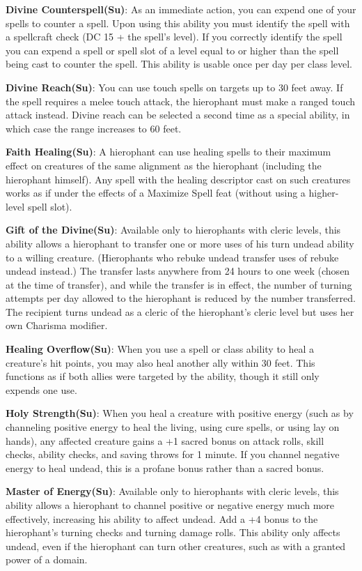 \textbf{Divine Counterspell(Su)}: As an immediate action, you can expend one of your spells to counter a spell. Upon using this ability you must identify the spell with a spellcraft check (DC 15 + the spell's level). If you correctly identify the spell you can expend a spell or spell slot of a level equal to or higher than the spell being cast to counter the spell. This ability is usable once per day per class level.

\textbf{Divine Reach(Su)}: You can use touch spells on targets up to 30 feet away. If the spell requires a melee touch attack, the hierophant must make a ranged touch attack instead. Divine reach can be selected a second time as a special ability, in which case the range increases to 60 feet.

\textbf{Faith Healing(Su)}: A hierophant can use healing spells to their maximum effect on creatures of the same alignment as the hierophant (including the hierophant himself). Any spell with the healing descriptor cast on such creatures works as if under the effects of a Maximize Spell feat (without using a higher-level spell slot).

\textbf{Gift of the Divine(Su)}: Available only to hierophants with cleric levels, this ability allows a hierophant to transfer one or more uses of his turn undead ability to a willing creature. (Hierophants who rebuke undead transfer uses of rebuke undead instead.) The transfer lasts anywhere from 24 hours to one week (chosen at the time of transfer), and while the transfer is in effect, the number of turning attempts per day allowed to the hierophant is reduced by the number transferred. The recipient turns undead as a cleric of the hierophant’s cleric level but uses her own Charisma modifier.

\textbf{Healing Overflow(Su)}: When you use a spell or class ability to heal a creature's hit points, you may also heal another ally within 30 feet. This functions as if both allies were targeted by the ability, though it still only expends one use.

\textbf{Holy Strength(Su)}: When you heal a creature with positive energy (such as by channeling positive energy to heal the living, using cure spells, or using lay on hands), any affected creature gains a +1 sacred bonus on attack rolls, skill checks, ability checks, and saving throws for 1 minute. If you channel negative energy to heal undead, this is a profane bonus rather than a sacred bonus.

\textbf{Master of Energy(Su)}: Available only to hierophants with cleric levels, this ability allows a hierophant to channel positive or negative energy much more effectively, increasing his ability to affect undead. Add a +4 bonus to the hierophant’s turning checks and turning damage rolls. This ability only affects undead, even if the hierophant can turn other creatures, such as with a granted power of a domain.

